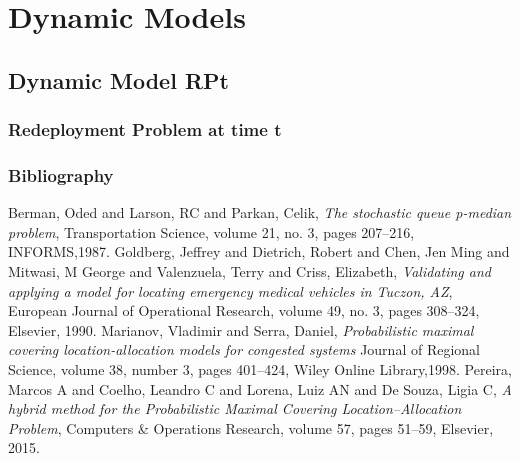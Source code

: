 \documentclass[10pt,usenames,dvipsnames,svgnames,table]{beamer}
\begin{document}
\section{Dynamic Models}
\subsection{Dynamic Model RPt}
\begin{frame}[allowframebreaks]
  \frametitle{Redeployment Problem at time t}
  
\end{frame}

\begin{frame}[allowframebreaks]
  \frametitle<presentation>{Bibliography}    
  \begin{thebibliography}{10}    
    \beamertemplatebookbibitems
    Berman, Oded and Larson, RC and Parkan, Celik,
    \emph{The stochastic queue p-median problem},
    Transportation Science, volume 21, no. 3, pages 207--216, INFORMS,1987.
    Goldberg, Jeffrey and Dietrich, Robert and Chen, Jen Ming and Mitwasi, M George and Valenzuela, Terry and Criss, Elizabeth,
    \emph{Validating and applying a model for locating emergency medical vehicles in Tuczon, AZ},
    European Journal of Operational Research, volume 49, no. 3, pages 308--324, Elsevier, 1990.
    Marianov, Vladimir and Serra, Daniel,
    \emph{Probabilistic maximal covering location-allocation models for congested systems}
    Journal of Regional Science, volume 38, number 3, pages 401--424, Wiley Online Library,1998.
    Pereira, Marcos A and Coelho, Leandro C and Lorena, Luiz AN and De Souza, Ligia C,
    \emph{A hybrid method for the Probabilistic Maximal Covering Location--Allocation Problem},
    Computers \& Operations Research, volume 57, pages 51--59, Elsevier, 2015.
  \end{thebibliography}
\end{frame}
\end{document}
